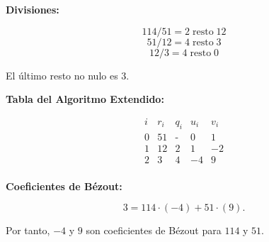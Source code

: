 \documentclass[a4paper,12pt]{article}
\begin{document}

\begin{ejemplo}[title={Cálculo de \(\text{mcd}(114,51)\) y coeficientes de Bézout}]
\textbf{Divisiones:}

\[
114 / 51 = 2 \;\text{resto}\; 12
\]
\[
51 / 12 = 4 \;\text{resto}\; \boxed{3}
\]
\[
12 / 3 = 4 \;\text{resto}\; 0
\]

El último resto no nulo es \(\boxed{3}\).

\bigskip

\textbf{Tabla del Algoritmo Extendido:}

\[
\begin{array}{c|c|c|c|c}
i & r_i & q_i & u_i & v_i \\
\hline
0 & 51 & \text{-} & 0 & 1 \\
1 & 12 & 2 & 1 & -2 \\
2 & \boxed{3} & 4 & -4 & 9 \\
\end{array}
\]

\bigskip

\textbf{Coeficientes de Bézout:}

\[
\boxed{3} = 114 \cdot (-4) + 51 \cdot (9).
\]

Por tanto, \(-4\) y \(9\) son coeficientes de Bézout para \(114\) y \(51\).
\end{ejemplo}

\end{document}
